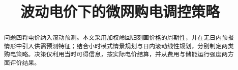 \documentclass[withoutpreface,bwprint]{cumcmthesis}
\title{波动电价下的微网购电调控策略}  %
\begin{document}
\maketitle
\thispagestyle{plain}
\begin{abstract}
问题四将电价纳入滚动预测。本文采用加权岭回归刻画价格的周期性，并在无日内预报情形中引入供需预测特征；结合小时模式情景规划与日内滚动线性规划，分别制定两类购电策略。决策仅利用当时可得信息，按实际电价结算，并从费用与储能运行强度两方面评价结果。
\end{abstract}
\setcounter{section}{7}

\end{document}

